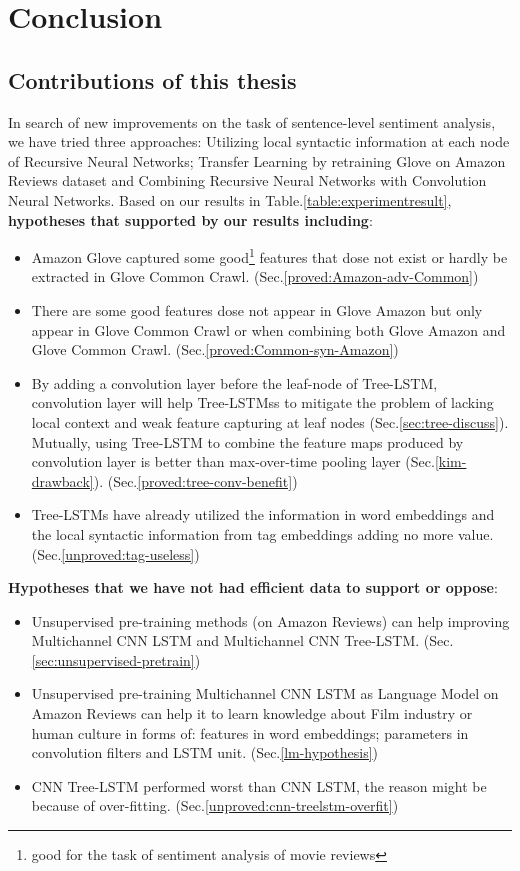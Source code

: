 \hypertarget{chap:conclude}{\chapter{Conclusion}}\label{conclusion}
\section{Contributions of this thesis}
In search of new improvements on the task of sentence-level sentiment analysis, we have tried three approaches: Utilizing local syntactic information at each node of Recursive Neural Networks; Transfer Learning by retraining Glove on Amazon Reviews dataset and Combining Recursive Neural Networks with Convolution Neural Networks.
Based on our results in Table.\ref{table:experimentresult}, \textbf{hypotheses that supported by our results including}:
\begin{itemize}
\item Amazon Glove captured some good\footnote{good for the task of sentiment analysis of movie reviews} features that dose not exist or hardly be extracted in Glove Common Crawl. (Sec.\ref{proved:Amazon-adv-Common})

\item There are some good features dose not appear in Glove Amazon but only appear in Glove Common Crawl or when combining both Glove Amazon and Glove Common Crawl. (Sec.\ref{proved:Common-syn-Amazon})

\item By adding a convolution layer before the leaf-node of Tree-LSTM, convolution layer will help Tree-LSTMss to mitigate the problem of lacking local context and weak feature capturing at leaf nodes (Sec.\ref{sec:tree-discuss}).
Mutually, using Tree-LSTM to combine the feature maps produced by convolution layer is better than max-over-time pooling layer (Sec.\ref{kim-drawback}). (Sec.\ref{proved:tree-conv-benefit})

\item  Tree-LSTMs have already utilized the information in word embeddings and the local syntactic information from tag embeddings adding no more value. (Sec.\ref{unproved:tag-useless})
\end{itemize}
\bigbreak
\label{unproved-hypo}
\textbf{Hypotheses that we have not had efficient data to support or oppose}:
\begin{itemize}
\item Unsupervised pre-training methods (on Amazon Reviews) can help improving Multichannel CNN LSTM and Multichannel CNN Tree-LSTM. (Sec.\ref{sec:unsupervised-pretrain})

\item  Unsupervised pre-training Multichannel CNN LSTM as Language Model on Amazon Reviews can help it to learn knowledge about Film industry or human culture in forms of: features in word embeddings; parameters in convolution filters and LSTM unit. (Sec.\ref{lm-hypothesis})

\item CNN Tree-LSTM performed worst than CNN LSTM, the reason might be because of over-fitting. (Sec.\ref{unproved:cnn-treelstm-overfit})
\end{itemize}

